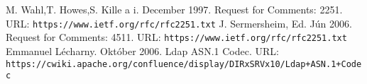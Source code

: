 \documentclass[11pt,a4paper]{article}
\begin{document}
\newpage
     
\begin{thebibliography}{9}
M. Wahl,T. Howes,S. Kille a i. December 1997. Request for Comments: 2251. URL: \texttt{https://www.ietf.org/rfc/rfc2251.txt}
J. Sermersheim, Ed. Jún 2006. Request for Comments: 4511. URL: \texttt{https://www.ietf.org/rfc/rfc2251.txt}
Emmanuel Lécharny. Október 2006. Ldap ASN.1 Codec. URL: \\\texttt{https://cwiki.apache.org/confluence/display/DIRxSRVx10/Ldap+ASN.1+Codec}

\end{thebibliography}
\end{document}
